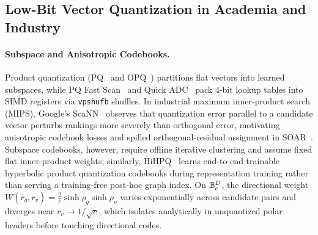 \subsection{Low-Bit Vector Quantization in Academia and Industry}
\label{subsec:rel_quantization}

\paragraph{Subspace and Anisotropic Codebooks.}
Product quantization ({PQ}~\cite{jegou2011pq} and {OPQ}~\cite{ge2013opq}) partitions flat vectors into learned subspaces, while {PQ Fast Scan}~\cite{andre2015cache} and {Quick ADC}~\cite{andre2017accelerated} pack 4-bit lookup tables into {SIMD} registers via \texttt{vpshufb} shuffles.
In industrial maximum inner-product search ({MIPS}), Google's {ScaNN}~\cite{guo2020accelerating} observes that quantization error parallel to a candidate vector perturbs rankings more severely than orthogonal error, motivating anisotropic codebook losses and spilled orthogonal-residual assignment in {SOAR}~\cite{sun2023soar}.
Subspace codebooks, however, require offline iterative clustering and assume fixed flat inner-product weights; similarly, {HiHPQ}~\cite{qiu2024hihpq} learns end-to-end trainable hyperbolic product quantization codebooks during representation training rather than serving a training-free post-hoc graph index.
On $\mathbb{B}_c^D$, the directional weight $W(r_q, r_v) = \frac{2}{c}\sinh\rho_q\sinh\rho_v$ varies exponentially across candidate pairs and diverges near $r_v \to 1/\sqrt{c}$, which \rquiver{} isolates analytically in unquantized polar headers before touching directional codes.

